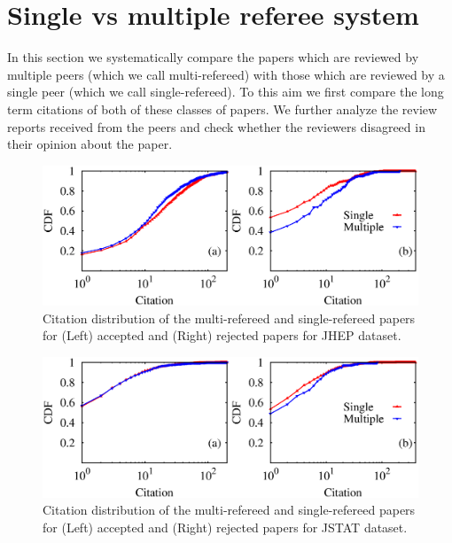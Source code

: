 \noindent
\section{Single vs multiple referee system}
\label{mvs}
In this section we systematically compare the papers which are reviewed by multiple peers (which we call multi-refereed) with those which are reviewed by a single peer 
(which we call single-refereed). 
To this aim 
we first compare the long term citations of both of these classes of papers. We further analyze the review reports received from the peers and check whether 
the reviewers disagreed in their opinion about the paper. 

\begin{figure}
 \centering
 \includegraphics[scale = 0.35]{./texfiles/Chapter_4/cikm_17/figures/citation_jhep_1.eps}
 \caption{\label{citation:jhep} Citation distribution of the multi-refereed and single-refereed papers for (Left) accepted and (Right) rejected papers for JHEP dataset.} 
 \vspace{3mm}
 \end{figure}

\begin{figure}
 \centering
 \includegraphics[scale = 0.35]{./texfiles/Chapter_4/cikm_17/figures/citation_jstat_1.eps}
 \caption{\label{citation:jstat} Citation distribution of the multi-refereed and single-refereed papers for (Left) accepted and (Right) rejected papers for JSTAT dataset.}
 \vspace{3mm}
 \end{figure}



